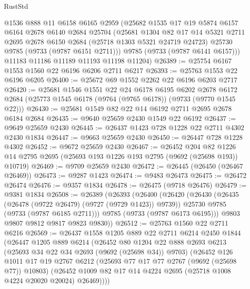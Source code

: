 \begin{lexlean}{RustStd}
\begin{coremodule}
      @1536
      @888
      @11
      @6158
      @6165
      @2959
      (@25682
        @1535
        @17
        @19
        @5874
        @6157
        @6164
        @2678
        @6140
        @2684
        @25704
        (@25681
          @1304
          @82
          @17
          @14
          @5321
          @2711
          @2695
          @2678
          @6150
          @2684
          (@25718 @1303 @5321 @24719 @24723)
          @25730
          @9785
          (@9733 (@9787 @6151 @2711)))
        @9785
        (@9733 (@9787 @6141 @6157)))
      @11183
      @11186
      @11189
      @11193
      @11198
      @11204)
@26389 := @25754 @6167 @1553 @1560 @22 @6196 @6206 @2711 @6217
@26393 := @25763 @1553 @22 @6196 @6205
@26400 := @25672 @69 @1552 @2262 @22 @6196 @6203 @2717
@26420 := @25681
    @1546
    @1551
    @22
    @24
    @6178
    @6195
    @6202
    @2678
    @6172
    @2684
    (@25773 @1545 @6178 (@9764 (@9765 @6178)) (@9733 (@9770 @1545 @22)))
@26430 := @25681 @1549 @82 @22 @14 @6192 @2711 @2695 @2678 @6184 @2684
@26435 := @9640 @25659 @2430 @1549 @22 @6192
@26437 := @9649 @25659 @2430
@26445 := @26437 @1423 @728 @1228 @22 @2711 @4302 @2430 @1834
@26447 := @9663 @25659 @2430
@26450 := @26447 @728 @1228 @4302
@26452 := @9672 @25659 @2430
@26467 := @26452
    @204
    @82
    @1226
    @14
    @2795
    @2695
    (@25693 @193 @1226 @193 @2795 (@9692 (@25698 @193)) @10719)
@26469 := @9709 @25659 @2430
@26472 := @26445 (@26450 (@26467 @26469))
@26473 := @9287 @1423
@26474 := @9483 @26473
@26475 := @26472 @26474
@26476 := @9357 @1834
@26478 := @26475 (@9718 @26476)
@26479 := @9381 @1834
@26508 := @26389
    (@26393
      (@26400
        (@26420
          (@26430
            (@26435 (@26478 (@9722 @26479) (@9727 (@9729 @1423)) @9739))
            @25730
            @9785
            (@9733 (@9787 @6185 @2711)))
          @9785
          (@9733 (@9787 @6173 @6195)))
        @9803
        @9807
        @9812
        @9817
        @9823
        @9830))
@26512 := @25763 @1560 @22 @2711 @6216
@26569 := @26437
    @1558
    @1205
    @889
    @22
    @2711
    @6214
    @2450
    @1844
    (@26447
      @1205
      @889
      @6214
      (@26452
        @80
        @1204
        @22
        @888
        @2693
        @6213
        (@25693 @34 @22 @34 @2693 (@9692 (@25698 @34)) @9703)
        (@26452
          @126
          @1011
          @17
          @19
          @2767
          @6212
          (@25693 @77 @17 @77 @2767 (@9692 (@25698 @77)) @10803)
          (@26452 @1009 @82 @17 @14 @4224 @2695 (@25718 @1008 @4224 @20020 @20024) @26469))))

\end{coremodule}
\end{lexlean}
